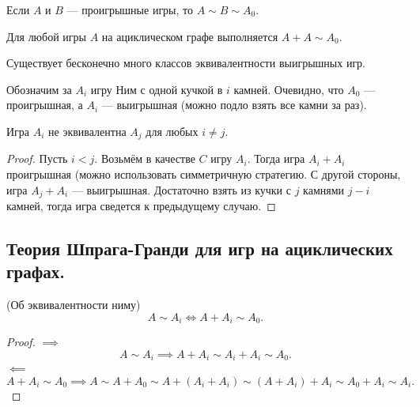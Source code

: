 \begin{remark}
  Если $A$ и $B$ --- проигрышные игры, то $A \sim B \sim A_0$.
\end{remark}

\begin{remark}
  Для любой игры $A$ на ациклическом графе выполняется $A + A \sim A_0$.
\end{remark}

\begin{remark}
  Существует бесконечно много классов эквивалентности выигрышных игр.
\end{remark}

Обозначим за $A_{i}$ игру Ним с одной кучкой в $i$ камней. Очевидно, что $A_0$ --- проигрышная, а
$A_{i}$ --- выигрышная (можно подло взять все камни за раз).
\begin{lemma}
  Игра $A_{i}$ не эквивалентна $A_{j}$ для любых $i \neq j$.
\end{lemma}
\begin{proof}
  Пусть $i < j$. Возьмём в качестве $C$ игру $A_{i}$. Тогда игра $A_{i} + A_{i}$ проигрышная
  (можно использовать симметричную стратегию. С другой стороны, игра $A_{j} + A_{i}$ --- выигрышная.
  Достаточно взять из кучки с $j$ камнями $j - i$ камней, тогда игра сведется к предыдущему случаю.
\end{proof}

\subsection{Теория Шпрага-Гранди для игр на ациклических графах.}
\begin{lemma}{(Об эквивалентности ниму)}
  \[
  A \sim A_{i} \iff A + A_{i} \sim A_0
  .\] 
\end{lemma}
\begin{proof}
  $\implies$
  \[
  A \sim A_{i} \implies A + A_{i} \sim A_{i} + A_{i} \sim A_0
  .\] 
  $\impliedby$
  \[
    A + A_{i} \sim A_0 \implies A \sim A + A_0 \sim A + (A_{i} + A_{i}) \sim (A + A_{i}) + A_{i} \sim 
    A_0 + A_{i} \sim A_{i}
  .\] 
\end{proof}

